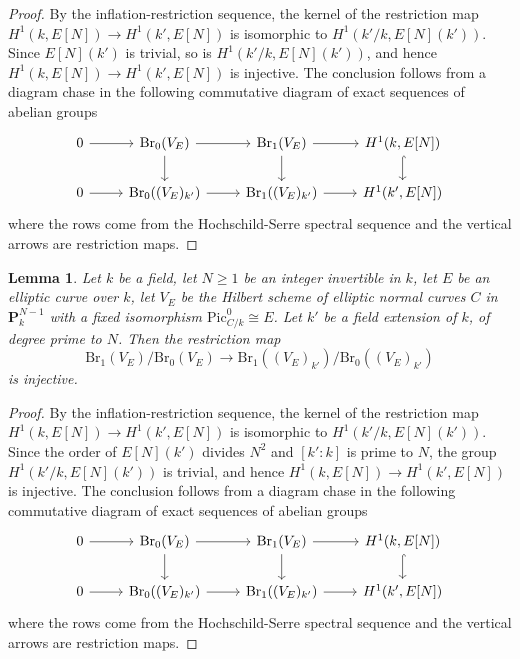 \documentclass[10pt,letterpaper,twoside]{article}
\renewcommand{\1}{\mathbf{1}}
\newcommand{\bP}{\mathbf{P}}
\renewcommand{\geq}{\geqslant}
\newcommand{\Pic}{\mathrm{Pic}}
\newcommand{\Br}{\mathrm{Br}}
\newcommand{\iso}{\cong}
\theoremstyle{plain}
\newtheorem{lemma}[theorem]{Lemma}
\theoremstyle{plain}
\theoremstyle{definition}
\theoremstyle{named}
\theoremstyle{definition}
\begin{document}
\begin{proof}
    By the inflation-restriction sequence, the kernel of the restriction map $H^1(k,E[N])\to H^1(k',E[N])$ is isomorphic to $H^1(k'/k,E[N](k'))$. Since $E[N](k')$ is trivial, so is $H^1(k'/k,E[N](k'))$, and hence $H^1(k,E[N])\to H^1(k',E[N])$ is injective.  The conclusion follows from a diagram chase in the following commutative diagram of exact sequences of abelian groups
    \[
    \begin{tikzcd}
        0\arrow[r] &  \Br_0(V_E) \arrow[r] \arrow[d] & \Br_1(V_E) \arrow[r] \arrow[d] & H^1(k,E[N])\arrow[d,hook] \\
        0\arrow[r] &  \Br_0((V_E)_{k'}) \arrow[r] & \Br_1((V_E)_{k'}) \arrow[r] & H^1(k',E[N])
    \end{tikzcd}
    \]
    where the rows come from the Hochschild-Serre spectral sequence and the vertical arrows are restriction maps. 
\end{proof}


\begin{lemma}
    Let $k$ be a field, let $N\geq 1$ be an integer invertible in $k$, let $E$ be an elliptic curve over $k$, let $V_E$ be the Hilbert scheme of elliptic normal curves $C$ in $\bP^{N-1}_k$
    with a fixed isomorphism $\Pic_{C/k}^0\iso E$. Let $k'$ be a field extension of $k$, of degree prime to $N$. Then the restriction map
    \[\Br_1(V_E)/\Br_0(V_E)\to \Br_1((V_E)_{k'})/\Br_0((V_E)_{k'})\]
    is injective.
\end{lemma}

\begin{proof}
    By the inflation-restriction sequence, the kernel of the restriction map $H^1(k,E[N])\to H^1(k',E[N])$ is isomorphic to $H^1(k'/k,E[N](k'))$. Since the order of $E[N](k')$ divides $N^2$ and $[k':k]$ is prime to $N$, the group $H^1(k'/k,E[N](k'))$ is trivial, and hence $H^1(k,E[N])\to H^1(k',E[N])$ is injective. The conclusion follows from a diagram chase in the following commutative diagram of exact sequences of abelian groups
    \[
    \begin{tikzcd}
        0\arrow[r] &  \Br_0(V_E) \arrow[r] \arrow[d] & \Br_1(V_E) \arrow[r] \arrow[d] & H^1(k,E[N])\arrow[d,hook] \\
        0\arrow[r] &  \Br_0((V_E)_{k'}) \arrow[r] & \Br_1((V_E)_{k'}) \arrow[r] & H^1(k',E[N])
    \end{tikzcd}
    \]
    where the rows come from the Hochschild-Serre spectral sequence and the vertical arrows are restriction maps.
\end{proof}
\end{document}
